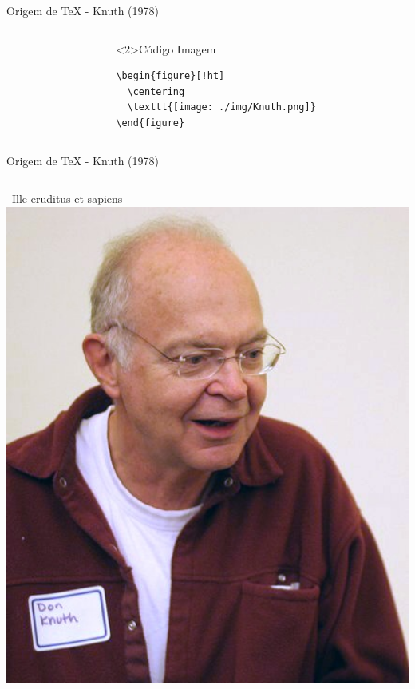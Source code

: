 \documentclass[bigger]{beamer}
\begin{document}
{\begin{frame}[label={sec:org70f3669},fragile]{Origem de \TeX{} - Knuth (1978)}
\begin{columns}
\begin{column}{0.48\columnwidth}
\begin{block}
\end{block}
\end{column}
\begin{column}{0.48\columnwidth}
\begin{block}<2>{Código Imagem}
\begin{verbatim}
\begin{figure}[!ht]
  \centering
  \texttt{[image: ./img/Knuth.png]}
\end{figure}
\end{verbatim}
\end{block}
\end{column}
\end{columns}
\end{frame}

\begin{frame}[label={sec:org60a9212}]{Origem de \TeX{} - Knuth (1978)}
\begin{columns}
\begin{column}{0.48\columnwidth}
\begin{block}{\small{~Ille eruditus et sapiens~}}
\href{img/KnuthAtOpenContentAlliance.jpg}{\includegraphics[width=1.02\textwidth]{./img/KnuthAtOpenContentAlliance.jpg}}
\end{block}
\end{column}


\end{columns}
\end{frame}}
\end{document}
